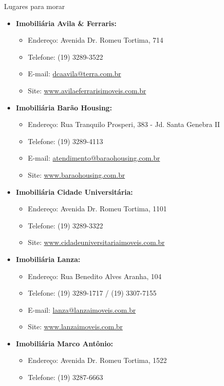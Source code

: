 \begin{story}{Lugares para morar}
\begin{itemize}
\item \textbf{Imobiliária Avila \& Ferraris:}
\begin{itemize}
\item Endereço: Avenida Dr. Romeu Tortima, 714
\item Telefone: (19) 3289-3522
\item E-mail: \url{dcaavila@terra.com.br}
\item Site: \url{www.avilaeferrarisimoveis.com.br}
\end{itemize}

\item \textbf{Imobiliária Barão Housing:}
\begin{itemize}
\item Endereço: Rua Tranquilo Prosperi, 383 - Jd. Santa Genebra II
\item Telefone: (19) 3289-4113
\item E-mail: \url{atendimento@baraohousing.com.br}
\item Site: \url{www.baraohousing.com.br}
\end{itemize}

\item \textbf{Imobiliária Cidade Universitária:}
\begin{itemize}
\item Endereço: Avenida Dr. Romeu Tortima, 1101
\item Telefone: (19) 3289-3322
\item Site: \url{www.cidadeuniversitariaimoveis.com.br}
\end{itemize}

\item \textbf{Imobiliária Lanza:}
\begin{itemize}
\item Endereço: Rua Benedito Alves Aranha, 104
\item Telefone: (19) 3289-1717 / (19) 3307-7155
\item E-mail: \url{lanza@lanzaimoveis.com.br}
\item Site: \url{www.lanzaimoveis.com.br}
\end{itemize}

\item \textbf{Imobiliária Marco Antônio:}
\begin{itemize}
\item Endereço: Avenida Dr. Romeu Tortima, 1522
\item Telefone: (19) 3287-6663
\end{itemize}


\end{itemize}
\end{story}
